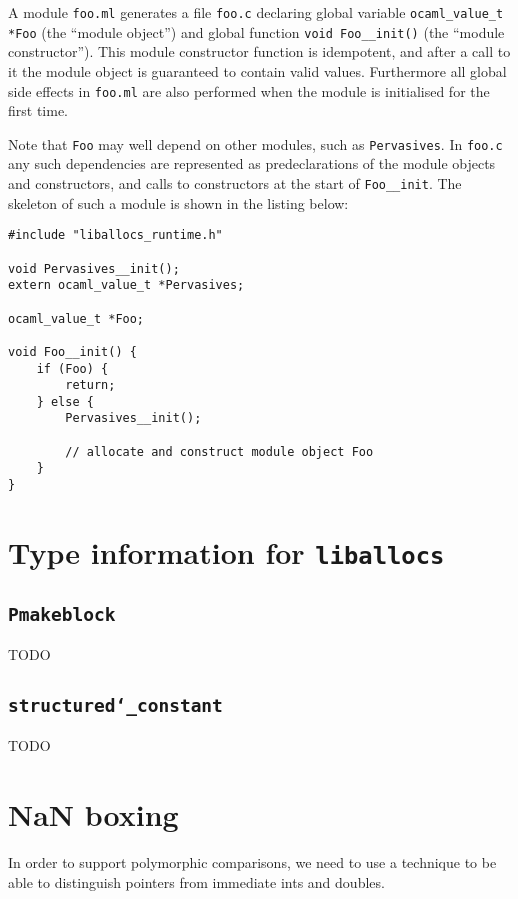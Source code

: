 \documentclass[12pt,a4paper,twoside,openright]{report}
\begin{document}
A module \lstinline!foo.ml! generates a file \lstinline!foo.c! declaring global
variable \lstinline!ocaml_value_t *Foo! (the ``module object'') and global
function \lstinline!void Foo__init()! (the ``module constructor''). This module
constructor function is idempotent, and after a call to it the module object is
guaranteed to contain valid values. Furthermore all global side effects in
\lstinline!foo.ml! are also performed when the module is initialised for the
first time.

Note that \lstinline!Foo! may well depend on other modules, such as
\lstinline!Pervasives!. In \lstinline!foo.c! any such dependencies are
represented as predeclarations of the module objects and constructors, and
calls to constructors at the start of \lstinline!Foo__init!. The skeleton of
such a module is shown in the listing below:

\begin{lstlisting}
#include "liballocs_runtime.h"

void Pervasives__init();
extern ocaml_value_t *Pervasives;

ocaml_value_t *Foo;

void Foo__init() {
    if (Foo) {
        return;
    } else {
        Pervasives__init();

        // allocate and construct module object Foo
    }
}
\end{lstlisting}

\section{Type information for \texttt{liballocs}}\label{type-information-for-liballocs}

\subsection{\texttt{Pmakeblock}}

TODO

\subsection{\texttt{structured\char`_constant}}

TODO

\section{NaN boxing}\label{nan-boxing}

In order to support polymorphic comparisons, we need to use a technique to be
able to distinguish pointers from immediate ints and doubles.
\end{document}
